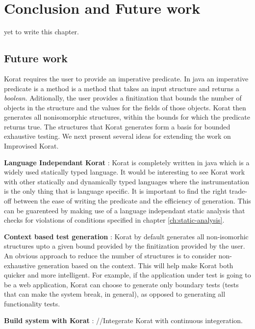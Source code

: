 \chapter{Conclusion and Future work}
\label{ch:conclusion-future-work}
yet to write this chapter.

\section{Future work}
\label{sec:future-work}
Korat requires the user to provide an imperative predicate. In java an imperative predicate is a method is a method that takes an input structure and returns a \emph{boolean}. Aditionally, the user provides a finitization that bounds the number of objects in the structure and the values for the fields of those objects. Korat then generates all nonisomorphic structures, within the bounds for which the predicate returns true. The structures that Korat generates form a basis for bounded exhaustive testing. We next present several ideas for extending the work on Improvised Korat.

\para
\textbf{Language Independant Korat} : Korat is completely written in java which is a widely used statically typed language. It would be interesting to see Korat work with other statically and dynamically typed languages where the instrumentation is the only thing that is language specific. It is important to find the right trade-off between the ease of writing the predicate and the efficiency of generation. This can be guarenteed by making use of a language independant static analysis that checks for violations of conditions specified in chapter \ref{ch:static-analysis}.

\para
\textbf{Context based test generation} : Korat by default generates all non-isomorhic structures upto a given bound provided by the finitization provided by the user. An obvious approach to reduce the number of structures is to consider non-exhaustive generation based on the context. This will help make Korat both quicker and more intelligent. For example, if the application under test is going to be a web application, Korat can choose to generate only boundary tests (tests that can make the system break, in general), as opposed to generating all functionality tests.

\para
\textbf{Build system with Korat} : //Integerate Korat with continuous integeration.


